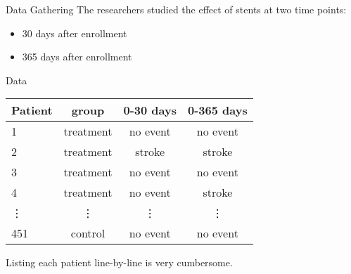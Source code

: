 \documentclass{beamer}
\begin{document}
\begin{frame}
\begin{block}{Data Gathering}
The researchers studied the effect of stents at two time points:\pause
\begin{itemize}
\item 30 days after enrollment\pause
\item 365 days after enrollment\pause
\end{itemize}
\end{block}

\begin{block}{Data}
\begin{center}
\begin{tabular}{lccc}\hline
Patient & group & 0-30 days & 0-365 days \\\hline
1 & treatment & no event & no event \\
2 & treatment & stroke & stroke \\
3 & treatment & no event & no event \\
4 & treatment & no event & stroke \\
\vdots & \vdots & \vdots & \vdots \\
451 & control & no event & no event
\end{tabular}
\end{center}
\end{block}\pause

\begin{note}
Listing each patient line-by-line is very cumbersome.
\end{note}
\end{frame}
\end{document}
